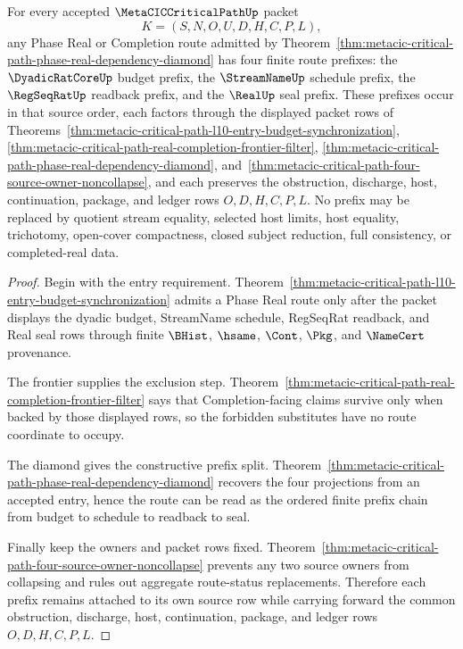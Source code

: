 \begin{theorem}
\label{thm:metacic-critical-path-l10-prefix-dependency-induction}
For every accepted $\MetaCICCriticalPathUp$ packet
$$
K=(S,N,O,U,D,H,C,P,L),
$$
any Phase Real or Completion route admitted by Theorem~\ref{thm:metacic-critical-path-phase-real-dependency-diamond} has four finite route prefixes: the $\DyadicRatCoreUp$ budget prefix, the $\StreamNameUp$ schedule prefix, the $\RegSeqRatUp$ readback prefix, and the $\RealUp$ seal prefix. These prefixes occur in that source order, each factors through the displayed packet rows of Theorems~\ref{thm:metacic-critical-path-l10-entry-budget-synchronization}, \ref{thm:metacic-critical-path-real-completion-frontier-filter}, \ref{thm:metacic-critical-path-phase-real-dependency-diamond}, and~\ref{thm:metacic-critical-path-four-source-owner-noncollapse}, and each preserves the obstruction, discharge, host, continuation, package, and ledger rows $O,D,H,C,P,L$. No prefix may be replaced by quotient stream equality, selected host limits, host equality, trichotomy, open-cover compactness, closed subject reduction, full consistency, or completed-real data.
\end{theorem}
\begin{proof}
Begin with the entry requirement. Theorem~\ref{thm:metacic-critical-path-l10-entry-budget-synchronization} admits a Phase Real route only after the packet displays the dyadic budget, StreamName schedule, RegSeqRat readback, and Real seal rows through finite $\BHist$, $\hsame$, $\Cont$, $\Pkg$, and $\NameCert$ provenance.

The frontier supplies the exclusion step. Theorem~\ref{thm:metacic-critical-path-real-completion-frontier-filter} says that Completion-facing claims survive only when backed by those displayed rows, so the forbidden substitutes have no route coordinate to occupy.

The diamond gives the constructive prefix split. Theorem~\ref{thm:metacic-critical-path-phase-real-dependency-diamond} recovers the four projections from an accepted entry, hence the route can be read as the ordered finite prefix chain from budget to schedule to readback to seal.

Finally keep the owners and packet rows fixed. Theorem~\ref{thm:metacic-critical-path-four-source-owner-noncollapse} prevents any two source owners from collapsing and rules out aggregate route-status replacements. Therefore each prefix remains attached to its own source row while carrying forward the common obstruction, discharge, host, continuation, package, and ledger rows $O,D,H,C,P,L$.
\end{proof}

